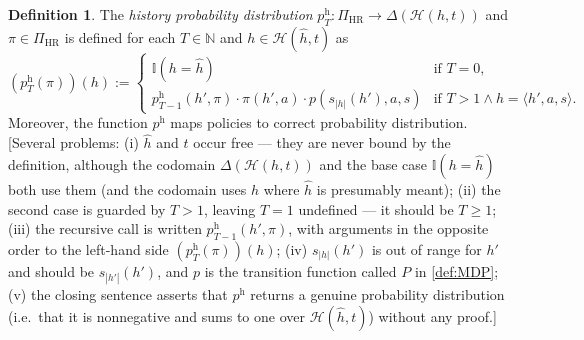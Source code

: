 \documentclass[letterpaper]{article}
\theoremstyle{plain}
\theoremstyle{definition}
\newtheorem{definition}[theorem]{Definition}
\theoremstyle{remark}
\newcommand{\Nats}{\mathbb{N}}
\newcommand{\PiHR}{\Pi_{\mathrm{HR}}}
\newcommand{\I}{\mathbb{I}}
\newcommand{\cc}[1]{\textcolor{ccolor}{[#1]}}
\newcommand{\lean}[1]{\textcolor{blue}{(\emph{LEAN}: \texttt{#1})}}
\newcommand{\leanok}{}
\begin{document}
\begin{definition}\label{def:hist-dist}
The \emph{history probability distribution} $p^{\mathrm{h}}_T \colon  \PiHR \to \Delta(\mathcal{H}(h,t))$  and $\pi \in \PiHR$ is defined for each $T \in \Nats$ and $h\in \mathcal{H}(\hat{h},t)$ as
\[
(p^{\mathrm{h}}_T(\pi))(h) :=
\begin{cases}
\I(h = \hat{h}) &\text{if } T = 0, \\
p_{T-1}^{\mathrm{h}}(h', \pi) \cdot \pi(h',a) \cdot  p(s_{|h|}(h'), a , s) &\text{if } T > 1 \wedge h = \langle h', a, s \rangle.
\end{cases}
\]
Moreover, the function $p^{\mathrm{h}}$ maps policies to correct probability distribution.
\cc{Several problems: (i) $\hat{h}$ and $t$ occur free --- they are never bound by the definition, although the codomain $\Delta(\mathcal{H}(h,t))$ and the base case $\I(h=\hat{h})$ both use them (and the codomain uses $h$ where $\hat{h}$ is presumably meant); (ii) the second case is guarded by $T>1$, leaving $T=1$ undefined --- it should be $T\ge 1$; (iii) the recursive call is written $p^{\mathrm{h}}_{T-1}(h',\pi)$, with arguments in the opposite order to the left-hand side $(p^{\mathrm{h}}_T(\pi))(h)$; (iv) $s_{|h|}(h')$ is out of range for $h'$ and should be $s_{|h'|}(h')$, and $p$ is the transition function called $P$ in \cref{def:MDP}; (v) the closing sentence asserts that $p^{\mathrm{h}}$ returns a genuine probability distribution (i.e.\ that it is nonnegative and sums to one over $\mathcal{H}(\hat{h},t)$) without any proof.}
\end{definition}
\end{document}
